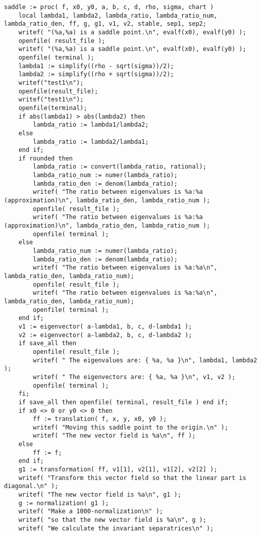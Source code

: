 \documentclass[a4paper,10pt]{article}
\begin{document}
\begin{lstlisting}[name=type]
saddle := proc( f, x0, y0, a, b, c, d, rho, sigma, chart )
    local lambda1, lambda2, lambda_ratio, lambda_ratio_num, lambda_ratio_den, ff, g, g1, v1, v2, stable, sep1, sep2;
    writef( "(%a,%a) is a saddle point.\n", evalf(x0), evalf(y0) );
    openfile( result_file );
    writef( "(%a,%a) is a saddle point.\n", evalf(x0), evalf(y0) );
    openfile( terminal );
    lambda1 := simplify((rho - sqrt(sigma))/2);
    lambda2 := simplify((rho + sqrt(sigma))/2);
    writef("test1\n");
    openfile(result_file);
    writef("test1\n");
    openfile(terminal);
    if abs(lambda1) > abs(lambda2) then
        lambda_ratio := lambda1/lambda2;
    else
        lambda_ratio := lambda2/lambda1;
    end if;
    if rounded then
        lambda_ratio := convert(lambda_ratio, rational);
        lambda_ratio_num := numer(lambda_ratio);
        lambda_ratio_den := denom(lambda_ratio);
        writef( "The ratio between eigenvalues is %a:%a (approximation)\n", lambda_ratio_den, lambda_ratio_num );
        openfile( result_file );
        writef( "The ratio between eigenvalues is %a:%a (approximation)\n", lambda_ratio_den, lambda_ratio_num );
        openfile( terminal );
    else
        lambda_ratio_num := numer(lambda_ratio);
        lambda_ratio_den := denom(lambda_ratio);
        writef( "The ratio between eigenvalues is %a:%a\n", lambda_ratio_den, lambda_ratio_num);
        openfile( result_file );
        writef( "The ratio between eigenvalues is %a:%a\n", lambda_ratio_den, lambda_ratio_num);
        openfile( terminal );
    end if;
    v1 := eigenvector( a-lambda1, b, c, d-lambda1 );
    v2 := eigenvector( a-lambda2, b, c, d-lambda2 );
    if save_all then
        openfile( result_file );
        writef( " The eigenvalues are: { %a, %a }\n", lambda1, lambda2 );
        writef( " The eigenvectors are: { %a, %a }\n", v1, v2 );
        openfile( terminal );
    fi;
    if save_all then openfile( terminal, result_file ) end if;
    if x0 <> 0 or y0 <> 0 then
        ff := translation( f, x, y, x0, y0 );
        writef( "Moving this saddle point to the origin.\n" );
        writef( "The new vector field is %a\n", ff );
    else
        ff := f;
    end if;
    g1 := transformation( ff, v1[1], v2[1], v1[2], v2[2] );
    writef( "Transform this vector field so that the linear part is diagonal.\n" );
    writef( "The new vector field is %a\n", g1 );
    g := normalization( g1 );
    writef( "Make a 1000-normalization\n" );
    writef( "so that the new vector field is %a\n", g );
    writef( "We calculate the invariant separatrices\n" );

\end{lstlisting}
\end{document}
